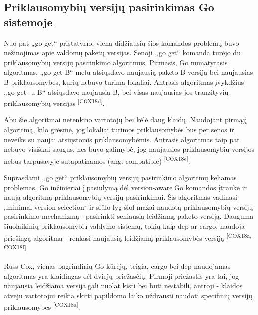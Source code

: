 \subsection{Priklausomybių versijų pasirinkimas Go sistemoje}

Nuo pat „go get“ pristatymo, viena didžiausių šios komandos problemų buvo
nežinojimas apie valdomų paketų versijas.
Senoji „go get“ komanda turėjo du priklausomybių versijų pasirinkimo algoritmus.
Pirmasis, Go numatytasis algoritmas, „go get B“ metu atsiųsdavo naujausią paketo B versiją
bei naujausias B priklausomybes, kurių nebuvo turima lokaliai. Antrasis algoritmas įvykdžius „go get -u B“
atsiųsdavo naujausią B, bei visas naujausias jos tranzityvių priklausomybių versijas \textsuperscript{[COX18d]}.

Abu šie algoritmai netenkino vartotojų bei kėlė daug klaidų. Naudojant pirmąjį algoritmą,
kilo grėsmė, jog lokaliai turimos priklausomybės bus per senos ir neveiks su naujai atsiųstomis
priklausomybėmis. Antrasis algoritmas taip pat nebuvo visiškai saugus, nes buvo galimybė,
jog naujausios priklausomybių versijos nebus tarpusavyje sutapatinamos (ang. compatible) \textsuperscript{[COX18e]}.


Suprasdami „go get“ priklausomybių versijų pasirinkimo algoritmų keliamas problemas,
Go inžinieriai į pasiūlymą dėl version-aware Go komandos įtraukė ir naują algoritmą priklausomybių
versijų pasirinkimui. Šis algoritmas vadinasi „minimal version selection“ ir siūlo lyg šiol mažai naudotą
priklausomybių versijų pasirinkimo mechanizmą - pasirinkti seniausią leidžiamą paketo versiją.
Dauguma šiuolaikinių priklausomybių valdymo sistemų, tokių kaip dep ar cargo, naudoja priešingą algoritmą -
renkasi naujausią leidžiamą priklausomybės versiją \textsuperscript{[COX18a, COX18f]}.

Russ Cox, vienas pagrindinių Go kūrėjų, teigia, cargo bei dep naudojamas algoritmas yra klaidingas
dėl dviejų priežasčių. Pirmoji priežastis yra tai, jog naujausia leidžiama versija gali nuolat kisti
bei būti nestabili, antroji - klaidos atveju vartotojui reikia skirti papildomo
laiko uždrausti naudoti specifinių versijų priklausomybes \textsuperscript{[COX18a]}.


